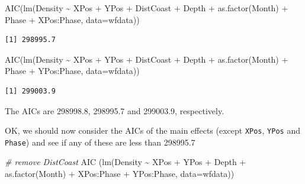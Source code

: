 \documentclass[
  oneside]{krantz}
\newenvironment{Shaded}{\begin{snugshade}}{\end{snugshade}}
\newcommand{\AttributeTok}[1]{\textcolor[rgb]{0.77,0.63,0.00}{#1}}
\newcommand{\CommentTok}[1]{\textcolor[rgb]{0.56,0.35,0.01}{\textit{#1}}}
\newcommand{\FunctionTok}[1]{\textcolor[rgb]{0.00,0.00,0.00}{#1}}
\newcommand{\NormalTok}[1]{#1}
\newcommand{\SpecialCharTok}[1]{\textcolor[rgb]{0.00,0.00,0.00}{#1}}
\begin{document}
\begin{Shaded}
\begin{Highlighting}[]
\FunctionTok{AIC}\NormalTok{(}\FunctionTok{lm}\NormalTok{(Density }\SpecialCharTok{\textasciitilde{}}\NormalTok{ XPos }\SpecialCharTok{+}\NormalTok{ YPos }\SpecialCharTok{+}\NormalTok{ DistCoast }\SpecialCharTok{+}\NormalTok{ Depth }\SpecialCharTok{+} \FunctionTok{as.factor}\NormalTok{(Month) }\SpecialCharTok{+}  
\NormalTok{                     Phase }\SpecialCharTok{+}\NormalTok{ XPos}\SpecialCharTok{:}\NormalTok{Phase, }\AttributeTok{data=}\NormalTok{wfdata))}
\end{Highlighting}
\end{Shaded}

\begin{verbatim}
[1] 298995.7
\end{verbatim}

\begin{Shaded}
\begin{Highlighting}[]
\FunctionTok{AIC}\NormalTok{(}\FunctionTok{lm}\NormalTok{(Density }\SpecialCharTok{\textasciitilde{}}\NormalTok{ XPos }\SpecialCharTok{+}\NormalTok{ YPos }\SpecialCharTok{+}\NormalTok{ DistCoast }\SpecialCharTok{+}\NormalTok{ Depth }\SpecialCharTok{+} \FunctionTok{as.factor}\NormalTok{(Month) }\SpecialCharTok{+}  
\NormalTok{                     Phase }\SpecialCharTok{+}\NormalTok{ YPos}\SpecialCharTok{:}\NormalTok{Phase, }\AttributeTok{data=}\NormalTok{wfdata))}
\end{Highlighting}
\end{Shaded}

\begin{verbatim}
[1] 299003.9
\end{verbatim}

\normalsize

The AICs are 298998.8, 298995.7 and 299003.9, respectively.

OK, we should now consider the AICs of the main effects (except \texttt{XPos}, \texttt{YPos} and \texttt{Phase}) and see if any of these are less than 298995.7

\small

\begin{Shaded}
\begin{Highlighting}[]
\CommentTok{\# remove DistCoast}
\FunctionTok{AIC}\NormalTok{ (}\FunctionTok{lm}\NormalTok{(Density }\SpecialCharTok{\textasciitilde{}}\NormalTok{ XPos }\SpecialCharTok{+}\NormalTok{ YPos }\SpecialCharTok{+}\NormalTok{ Depth }\SpecialCharTok{+} \FunctionTok{as.factor}\NormalTok{(Month) }\SpecialCharTok{+} 
\NormalTok{          XPos}\SpecialCharTok{:}\NormalTok{Phase }\SpecialCharTok{+}\NormalTok{ YPos}\SpecialCharTok{:}\NormalTok{Phase, }\AttributeTok{data=}\NormalTok{wfdata))}
\end{Highlighting}
\end{Shaded}
\end{document}

